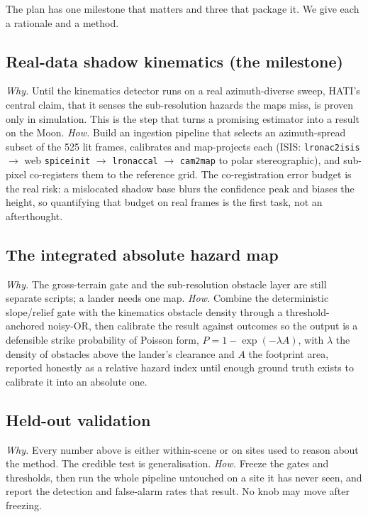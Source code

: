 \documentclass[11pt]{article}
\begin{document}
The plan has one milestone that matters and three that package it. We give each a rationale and
a method.

\subsection{Real-data shadow kinematics (the milestone)}
\emph{Why.} Until the kinematics detector runs on a real azimuth-diverse sweep, HATI's central
claim, that it senses the sub-resolution hazards the maps miss, is proven only in simulation.
This is the step that turns a promising estimator into a result on the Moon.
\emph{How.} Build an ingestion pipeline that selects an azimuth-spread subset of the 525 lit
frames, calibrates and map-projects each (ISIS: \texttt{lronac2isis} $\to$ web
\texttt{spiceinit} $\to$ \texttt{lronaccal} $\to$ \texttt{cam2map} to polar stereographic), and
sub-pixel co-registers them to the reference grid. The co-registration error budget is the real
risk: a mislocated shadow base blurs the confidence peak and biases the height, so quantifying
that budget on real frames is the first task, not an afterthought.

\subsection{The integrated absolute hazard map}
\emph{Why.} The gross-terrain gate and the sub-resolution obstacle layer are still separate
scripts; a lander needs one map. \emph{How.} Combine the deterministic slope/relief gate with
the kinematics obstacle density through a threshold-anchored noisy-OR, then calibrate the result
against outcomes so the output is a defensible strike probability of Poisson form,
$P=1-\exp(-\lambda A)$, with $\lambda$ the density of obstacles above the lander's clearance and
$A$ the footprint area, reported honestly as a relative hazard index until enough ground truth
exists to calibrate it into an absolute one.

\subsection{Held-out validation}
\emph{Why.} Every number above is either within-scene or on sites used to reason about the
method. The credible test is generalisation. \emph{How.} Freeze the gates and thresholds, then
run the whole pipeline untouched on a site it has never seen, and report the detection and
false-alarm rates that result. No knob may move after freezing.
\end{document}
